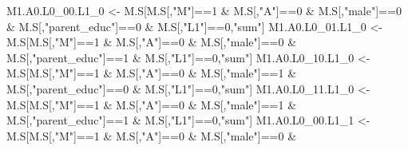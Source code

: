\documentclass[
]{book}
\newenvironment{Shaded}{\begin{snugshade}}{\end{snugshade}}
\newcommand{\DecValTok}[1]{\textcolor[rgb]{0.00,0.00,0.81}{#1}}
\newcommand{\NormalTok}[1]{#1}
\newcommand{\OtherTok}[1]{\textcolor[rgb]{0.56,0.35,0.01}{#1}}
\newcommand{\SpecialCharTok}[1]{\textcolor[rgb]{0.00,0.00,0.00}{#1}}
\newcommand{\StringTok}[1]{\textcolor[rgb]{0.31,0.60,0.02}{#1}}
\begin{document}
\begin{Shaded}
\begin{Highlighting}[]
\NormalTok{  M1.A0.L0\_00.L1\_0 }\OtherTok{\textless{}{-}}\NormalTok{ M.S[M.S[,}\StringTok{"M"}\NormalTok{]}\SpecialCharTok{==}\DecValTok{1} \SpecialCharTok{\&}\NormalTok{ M.S[,}\StringTok{"A"}\NormalTok{]}\SpecialCharTok{==}\DecValTok{0} \SpecialCharTok{\&}\NormalTok{ M.S[,}\StringTok{"male"}\NormalTok{]}\SpecialCharTok{==}\DecValTok{0} \SpecialCharTok{\&} 
\NormalTok{                            M.S[,}\StringTok{"parent\_educ"}\NormalTok{]}\SpecialCharTok{==}\DecValTok{0} \SpecialCharTok{\&}\NormalTok{ M.S[,}\StringTok{"L1"}\NormalTok{]}\SpecialCharTok{==}\DecValTok{0}\NormalTok{,}\StringTok{"sum"}\NormalTok{]}
\NormalTok{  M1.A0.L0\_01.L1\_0 }\OtherTok{\textless{}{-}}\NormalTok{ M.S[M.S[,}\StringTok{"M"}\NormalTok{]}\SpecialCharTok{==}\DecValTok{1} \SpecialCharTok{\&}\NormalTok{ M.S[,}\StringTok{"A"}\NormalTok{]}\SpecialCharTok{==}\DecValTok{0} \SpecialCharTok{\&}\NormalTok{ M.S[,}\StringTok{"male"}\NormalTok{]}\SpecialCharTok{==}\DecValTok{0} \SpecialCharTok{\&} 
\NormalTok{                            M.S[,}\StringTok{"parent\_educ"}\NormalTok{]}\SpecialCharTok{==}\DecValTok{1} \SpecialCharTok{\&}\NormalTok{ M.S[,}\StringTok{"L1"}\NormalTok{]}\SpecialCharTok{==}\DecValTok{0}\NormalTok{,}\StringTok{"sum"}\NormalTok{]}
\NormalTok{  M1.A0.L0\_10.L1\_0 }\OtherTok{\textless{}{-}}\NormalTok{ M.S[M.S[,}\StringTok{"M"}\NormalTok{]}\SpecialCharTok{==}\DecValTok{1} \SpecialCharTok{\&}\NormalTok{ M.S[,}\StringTok{"A"}\NormalTok{]}\SpecialCharTok{==}\DecValTok{0} \SpecialCharTok{\&}\NormalTok{ M.S[,}\StringTok{"male"}\NormalTok{]}\SpecialCharTok{==}\DecValTok{1} \SpecialCharTok{\&} 
\NormalTok{                            M.S[,}\StringTok{"parent\_educ"}\NormalTok{]}\SpecialCharTok{==}\DecValTok{0} \SpecialCharTok{\&}\NormalTok{ M.S[,}\StringTok{"L1"}\NormalTok{]}\SpecialCharTok{==}\DecValTok{0}\NormalTok{,}\StringTok{"sum"}\NormalTok{]}
\NormalTok{  M1.A0.L0\_11.L1\_0 }\OtherTok{\textless{}{-}}\NormalTok{ M.S[M.S[,}\StringTok{"M"}\NormalTok{]}\SpecialCharTok{==}\DecValTok{1} \SpecialCharTok{\&}\NormalTok{ M.S[,}\StringTok{"A"}\NormalTok{]}\SpecialCharTok{==}\DecValTok{0} \SpecialCharTok{\&}\NormalTok{ M.S[,}\StringTok{"male"}\NormalTok{]}\SpecialCharTok{==}\DecValTok{1} \SpecialCharTok{\&} 
\NormalTok{                            M.S[,}\StringTok{"parent\_educ"}\NormalTok{]}\SpecialCharTok{==}\DecValTok{1} \SpecialCharTok{\&}\NormalTok{ M.S[,}\StringTok{"L1"}\NormalTok{]}\SpecialCharTok{==}\DecValTok{0}\NormalTok{,}\StringTok{"sum"}\NormalTok{]}
\NormalTok{  M1.A0.L0\_00.L1\_1 }\OtherTok{\textless{}{-}}\NormalTok{ M.S[M.S[,}\StringTok{"M"}\NormalTok{]}\SpecialCharTok{==}\DecValTok{1} \SpecialCharTok{\&}\NormalTok{ M.S[,}\StringTok{"A"}\NormalTok{]}\SpecialCharTok{==}\DecValTok{0} \SpecialCharTok{\&}\NormalTok{ M.S[,}\StringTok{"male"}\NormalTok{]}\SpecialCharTok{==}\DecValTok{0} \SpecialCharTok{\&} 

\end{Highlighting}
\end{Shaded}
\end{document}
